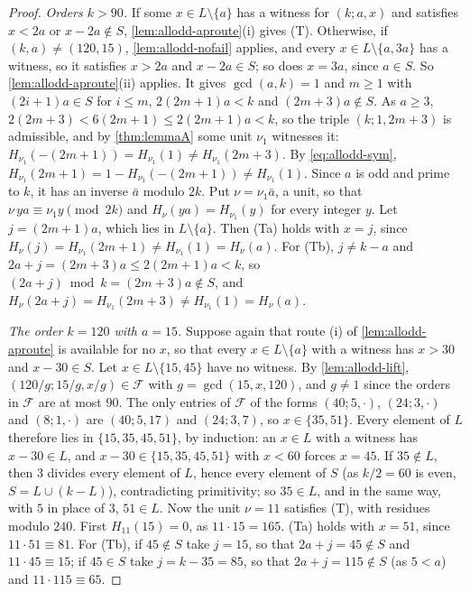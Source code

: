 \begin{proof}
\emph{Orders $k>90$.} If some $x\in L\setminus\{a\}$ has a witness
for $(k;a,x)$ and satisfies $x<2a$ or $x-2a\notin S$,
\autoref{lem:allodd-aproute}(i) gives (T). Otherwise, if
$(k,a)\ne(120,15)$, \autoref{lem:allodd-nofail} applies, and every $x\in L\setminus\{a,3a\}$ has a
witness, so it satisfies $x>2a$ and $x-2a\in S$; so does $x=3a$, since
$a\in S$. So \autoref{lem:allodd-aproute}(ii) applies. It gives
$\gcd(a,k)=1$ and $m\ge1$ with $(2i+1)a\in S$ for $i\le m$, $2(2m+1)a<k$
and $(2m+3)a\notin S$. As $a\ge3$, $2(2m+3)<6(2m+1)\le2(2m+1)a<k$, so the
triple $(k;1,2m+3)$ is admissible, and by \autoref{thm:lemmaA} some unit
$\nu_1$ witnesses it:
$H_{\nu_1}(-(2m+1))=H_{\nu_1}(1)\ne H_{\nu_1}(2m+3)$. By
\eqref{eq:allodd-sym}, $H_{\nu_1}(2m+1)=1-H_{\nu_1}(-(2m+1))\ne
H_{\nu_1}(1)$. Since $a$ is odd and prime to $k$, it has an inverse
$\bar a$ modulo $2k$. Put $\nu=\nu_1\bar a$, a unit, so that
$\nu\,ya\equiv\nu_1y\pmod{2k}$ and $H_\nu(ya)=H_{\nu_1}(y)$ for every
integer $y$. Let $j=(2m+1)a$, which lies in $L\setminus\{a\}$. Then (Ta)
holds with $x=j$, since
$H_\nu(j)=H_{\nu_1}(2m+1)\ne H_{\nu_1}(1)=H_\nu(a)$.
For (Tb), $j\ne k-a$ and $2a+j=(2m+3)a\le2(2m+1)a<k$, so
$(2a+j)\bmod k=(2m+3)a\notin S$, and
$H_\nu(2a+j)=H_{\nu_1}(2m+3)\ne H_{\nu_1}(1)=H_\nu(a)$.

\emph{The order $k=120$ with $a=15$.} Suppose again that route (i) of
\autoref{lem:allodd-aproute} is available for no $x$, so that every
$x\in L\setminus\{a\}$ with a witness has $x>30$ and $x-30\in S$. Let
$x\in L\setminus\{15,45\}$ have no witness. By \autoref{lem:allodd-lift},
$(120/g;15/g,x/g)\in\mathcal F$ with $g=\gcd(15,x,120)$, and $g\ne1$ since the
orders in $\mathcal F$ are at most $90$. The only entries of $\mathcal F$ of
the forms $(40;5,\cdot)$, $(24;3,\cdot)$ and $(8;1,\cdot)$ are $(40;5,17)$ and
$(24;3,7)$, so $x\in\{35,51\}$. Every element of $L$ therefore lies in
$\{15,35,45,51\}$, by induction: an $x\in L$ with a witness has $x-30\in L$,
and $x-30\in\{15,35,45,51\}$ with $x<60$ forces $x=45$. If $35\notin L$, then
$3$ divides every element of $L$, hence every element of $S$ (as $k/2=60$ is
even, $S=L\cup(k-L)$), contradicting primitivity; so $35\in L$, and in the same
way, with $5$ in place of $3$, $51\in L$. Now the unit $\nu=11$ satisfies (T),
with residues modulo $240$. First $H_{11}(15)=0$, as $11\cdot15=165$. (Ta)
holds with $x=51$, since $11\cdot51\equiv81$. For (Tb), if $45\notin S$ take
$j=15$, so that $2a+j=45\notin S$ and $11\cdot45\equiv15$; if $45\in S$ take
$j=k-35=85$, so that $2a+j=115\notin S$ (as $5<a$) and $11\cdot115\equiv65$.


\end{proof}
